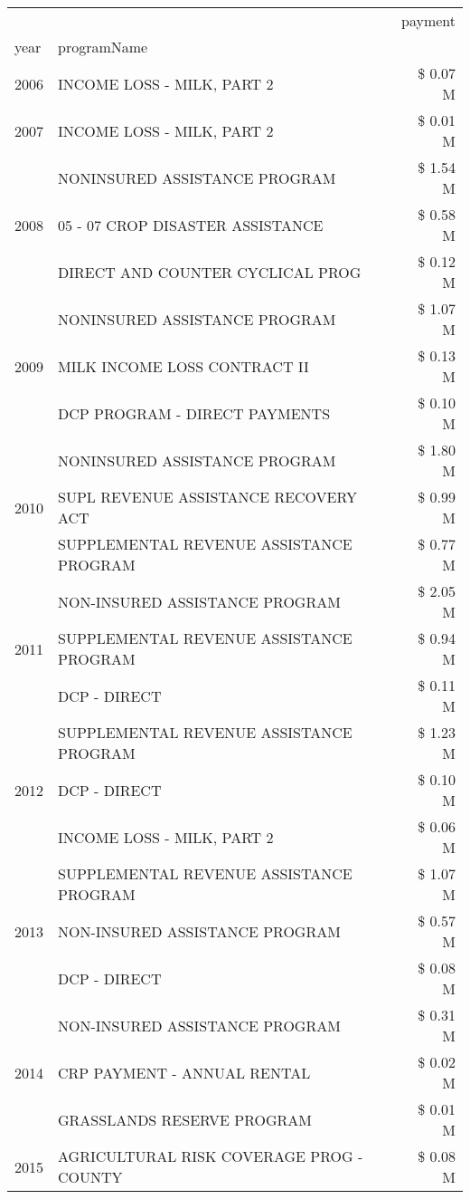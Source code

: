 \begin{tabular}{llr}
\toprule
 &  & payment \\
year & programName &  \\
\midrule
2006 & INCOME LOSS - MILK, PART 2 & \$ 0.07 M \\
\cline{1-3}
2007 & INCOME LOSS - MILK, PART 2 & \$ 0.01 M \\
\cline{1-3}
\multirow[t]{3}{*}{2008} & NONINSURED ASSISTANCE PROGRAM & \$ 1.54 M \\
 & 05 - 07 CROP DISASTER ASSISTANCE & \$ 0.58 M \\
 & DIRECT AND COUNTER CYCLICAL PROG & \$ 0.12 M \\
\cline{1-3}
\multirow[t]{3}{*}{2009} & NONINSURED ASSISTANCE PROGRAM & \$ 1.07 M \\
 & MILK INCOME LOSS CONTRACT II & \$ 0.13 M \\
 & DCP PROGRAM - DIRECT PAYMENTS & \$ 0.10 M \\
\cline{1-3}
\multirow[t]{3}{*}{2010} & NONINSURED ASSISTANCE PROGRAM & \$ 1.80 M \\
 & SUPL REVENUE ASSISTANCE RECOVERY ACT & \$ 0.99 M \\
 & SUPPLEMENTAL REVENUE ASSISTANCE PROGRAM & \$ 0.77 M \\
\cline{1-3}
\multirow[t]{3}{*}{2011} & NON-INSURED ASSISTANCE PROGRAM & \$ 2.05 M \\
 & SUPPLEMENTAL REVENUE ASSISTANCE PROGRAM & \$ 0.94 M \\
 & DCP - DIRECT & \$ 0.11 M \\
\cline{1-3}
\multirow[t]{3}{*}{2012} & SUPPLEMENTAL REVENUE ASSISTANCE PROGRAM & \$ 1.23 M \\
 & DCP - DIRECT & \$ 0.10 M \\
 & INCOME LOSS - MILK, PART 2 & \$ 0.06 M \\
\cline{1-3}
\multirow[t]{3}{*}{2013} & SUPPLEMENTAL REVENUE ASSISTANCE PROGRAM & \$ 1.07 M \\
 & NON-INSURED ASSISTANCE PROGRAM & \$ 0.57 M \\
 & DCP - DIRECT & \$ 0.08 M \\
\cline{1-3}
\multirow[t]{3}{*}{2014} & NON-INSURED ASSISTANCE PROGRAM & \$ 0.31 M \\
 & CRP PAYMENT - ANNUAL RENTAL & \$ 0.02 M \\
 & GRASSLANDS RESERVE PROGRAM & \$ 0.01 M \\
\cline{1-3}
\multirow[t]{3}{*}{2015} & AGRICULTURAL RISK COVERAGE PROG - COUNTY & \$ 0.08 M \\

\end{tabular}

